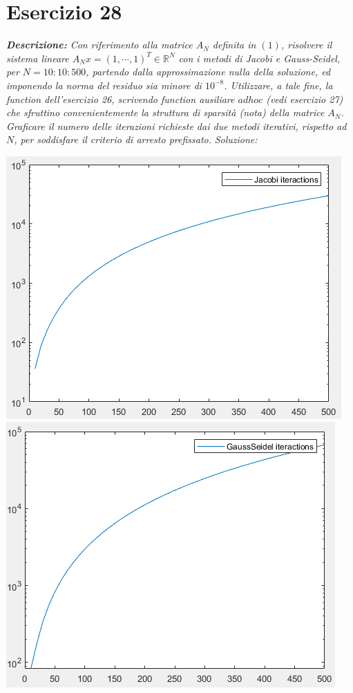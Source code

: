 \section{Esercizio 28}
\textit{\textbf{Descrizione:}  Con riferimento alla matrice $A_{N}$ definita in $(1)$,  risolvere il sistema lineare $A_{N}x=(1,\cdots,1)^{T}\in \mathbb{R}^{N}$ con i metodi di Jacobi e Gauss-Seidel, per $N = 10:10:500$, partendo dalla approssimazione nulla della soluzione, ed imponendo la norma del residuo sia minore di $10^{-8}$. Utilizzare, a tale fine, la function dell'esercizio 26, scrivendo function ausiliare $ad hoc$ (vedi esercizio 27) che sfruttino convenientemente la struttura di sparsità (nota) della matrice $A_{N}$.  Graficare il numero delle iterazioni richieste dai due metodi iterativi, rispetto ad $N$, per soddisfare il criterio di arresto prefissato.}
\noindent\emph{Soluzione: }\newline





\includegraphics[width=1\linewidth]{img/JacobiIter.png}
\includegraphics[width=1\linewidth]{img/GSiter.png}

